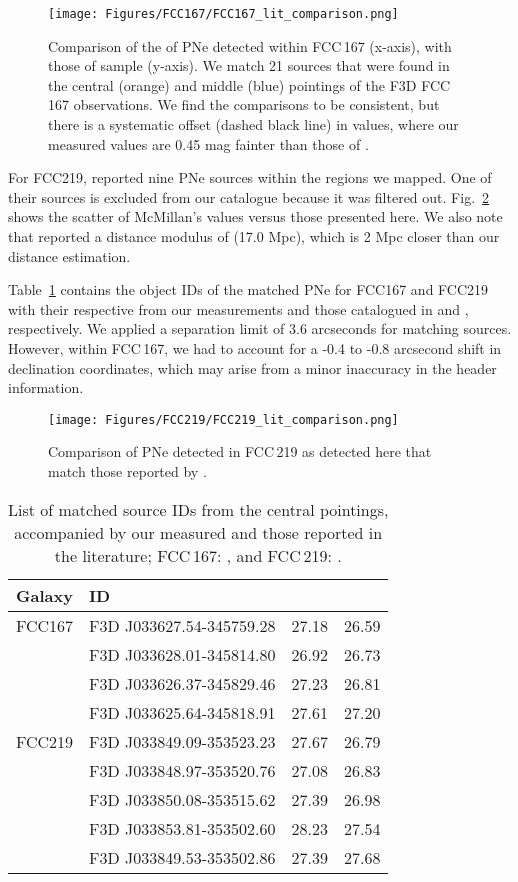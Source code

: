 \documentclass{aa}
\newcommand{\placefiglita}{
\begin{figure}
    \texttt{[image: Figures/FCC167/FCC167\_lit\_comparison.png]}
    \caption{Comparison of the  of PNe detected within FCC\,167 (x-axis), with those of \citet{feldmeier_calibrating_2007} sample (y-axis). We match 21 sources that were found in the central (orange) and middle (blue) pointings of the F3D FCC\,167 observations. We find the comparisons to be consistent, but there is a systematic offset (dashed black line) in values, where our measured  values are  0.45 mag fainter than those of \citet{feldmeier_calibrating_2007}.}    \label{fig:FCC167lit}
\end{figure}
}
\newcommand{\placefiglitb}{
\begin{figure}
    \texttt{[image: Figures/FCC219/FCC219\_lit\_comparison.png]}
    \caption{Comparison of PNe detected in FCC\,219 as detected here that match those reported by \citet{mcmillan_planetary_1993}.}
    \label{fig:FCC219lit}
\end{figure}
}
\begin{document}
\placefiglita

For FCC219, \citet{mcmillan_planetary_1993} reported nine PNe sources within the regions we mapped. One of their sources is excluded from our catalogue because it was filtered out. Fig.~\ref{fig:FCC219lit} shows the scatter of McMillan's  values versus those presented here. We also note that \citet{mcmillan_planetary_1993} reported a distance modulus of  (17.0 Mpc), which is  2 Mpc closer than our distance estimation.

Table~\ref{table:lit_comp} contains the object IDs of the matched PNe for FCC167 and FCC219 with their respective  from our measurements and those catalogued in \citet{feldmeier_calibrating_2007} and \citet{mcmillan_planetary_1993}, respectively. We applied a separation limit of 3.6 arcseconds for matching sources. However, within FCC\,167, we had to account for a -0.4 to -0.8 arcsecond shift in declination coordinates, which may arise from a minor inaccuracy in the header information.

\placefiglitb

\begin{table}
    \renewcommand{\arraystretch}{1.2}
    \centering
    \caption{List of matched source IDs from the central pointings, accompanied by our measured  and those reported in the literature; FCC\,167: \citet{feldmeier_calibrating_2007}, and FCC\,219: \citet{mcmillan_planetary_1993}.}
    \label{table:lit_comp}
    \begin{tabular}{llll}
    \hline
    Galaxy & ID &  & \\
    \hline 
    FCC167 & F3D J033627.54-345759.28 & 27.18 & 26.59 \\
           & F3D J033628.01-345814.80 & 26.92 & 26.73 \\
           & F3D J033626.37-345829.46 & 27.23 & 26.81 \\
           & F3D J033625.64-345818.91 & 27.61 & 27.20 \\
    \hline
    FCC219 & F3D J033849.09-353523.23 & 27.67 & 26.79 \\
           & F3D J033848.97-353520.76 & 27.08 & 26.83 \\
           & F3D J033850.08-353515.62 & 27.39 & 26.98 \\
           & F3D J033853.81-353502.60 & 28.23 & 27.54 \\
           & F3D J033849.53-353502.86 & 27.39 & 27.68 \\
    \hline
    \end{tabular}
    
\end{table}
\end{document}

